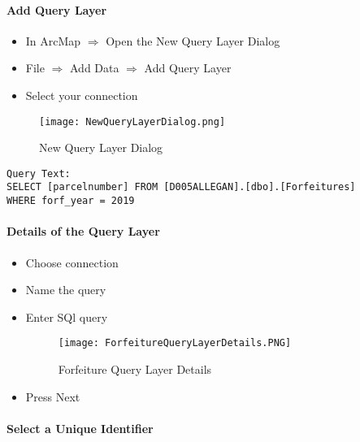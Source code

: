 \documentclass[class=book , crop=false, titlepage, twoside, multi={itemize, figure, verbatim}, float=false]{standalone}
\begin{document}
\clearpage
%
%
%
\paragraph[Add Query Layer]{Add Query Layer \texorpdfstring{\\}{}}
\vspace{.25in}

\begin{itemize}
\item In ArcMap $\Rightarrow$ {\Large Open the New Query Layer Dialog}
\item {\Large File $\Rightarrow$ Add Data $\Rightarrow$ Add Query Layer}
\item {\Large Select your connection}
\end{itemize}
\vspace{.25in}

%
%
\begin{figure}[h!]
\centering
    \texttt{[image: NewQueryLayerDialog.png]}
\caption{New Query Layer Dialog}
\end{figure}
\begin{verbatim}
Query Text:
SELECT [parcelnumber] FROM [D005ALLEGAN].[dbo].[Forfeitures]
WHERE forf_year = 2019
\end{verbatim}
\clearpage
%
%
%
\paragraph[Details of the Query Layer]{Details of the Query Layer \texorpdfstring{\\}{}}
%
\begin{itemize}
  \item Choose connection
  \item Name the query
  \item Enter SQl query
%
%
\begin{figure}[h!]
\centering
    \texttt{[image: ForfeitureQueryLayerDetails.PNG]}
\caption{Forfeiture Query Layer Details}
\end{figure}
%
\item Press Next
%
\end{itemize}
%
\clearpage
%
%
%
\paragraph[Select a Unique Identifier]{Select a Unique Identifier\texorpdfstring{\\}{}}
\end{document}
